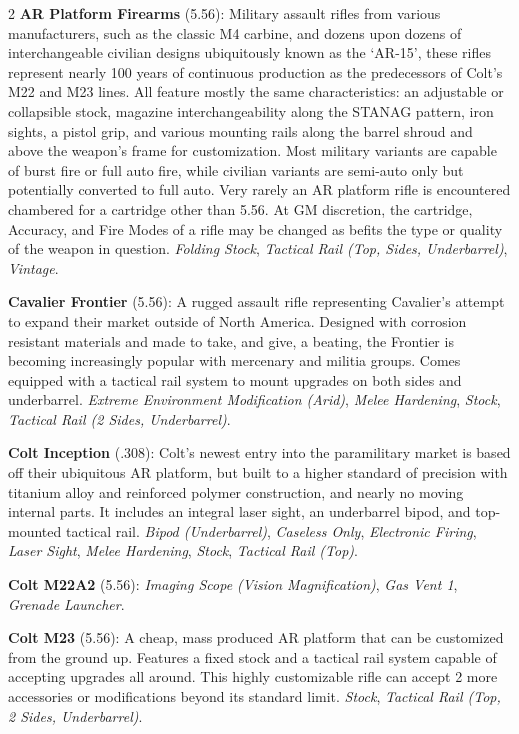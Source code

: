 \documentclass[
  oneside]{article}
\begin{document}
\begin{multicols}{2}
\textbf{AR Platform Firearms} (5.56): Military
assault rifles from various manufacturers, such as
the classic M4 carbine, and dozens upon dozens of
interchangeable civilian designs ubiquitously
known as the `AR-15', these rifles represent
nearly 100 years of continuous production as the
predecessors of Colt's M22 and M23 lines. All
feature mostly the same characteristics: an
adjustable or collapsible stock, magazine
interchangeability along the STANAG pattern, iron
sights, a pistol grip, and various mounting rails
along the barrel shroud and above the weapon's
frame for customization. Most military variants
are capable of burst fire or full auto fire, while
civilian variants are semi-auto only but
potentially converted to full auto. Very rarely an
AR platform rifle is encountered chambered for a
cartridge other than 5.56. At GM discretion, the
cartridge, Accuracy, and Fire Modes of a rifle may
be changed as befits the type or quality of the
weapon in question. \emph{Folding Stock},
\emph{Tactical Rail (Top, Sides, Underbarrel)},
\emph{Vintage}.

\textbf{Cavalier Frontier} (5.56): A rugged
assault rifle representing Cavalier's attempt to
expand their market outside of North America.
Designed with corrosion resistant materials and
made to take, and give, a beating, the Frontier is
becoming increasingly popular with mercenary and
militia groups. Comes equipped with a tactical
rail system to mount upgrades on both sides and
underbarrel. \emph{Extreme Environment
Modification (Arid)}, \emph{Melee Hardening},
\emph{Stock}, \emph{Tactical Rail (2 Sides,
Underbarrel)}.

\textbf{Colt Inception} (.308): Colt's newest
entry into the paramilitary market is based off
their ubiquitous AR platform, but built to a
higher standard of precision with titanium alloy
and reinforced polymer construction, and nearly no
moving internal parts. It includes an integral
laser sight, an underbarrel bipod, and top-mounted
tactical rail. \emph{Bipod (Underbarrel)},
\emph{Caseless Only}, \emph{Electronic Firing},
\emph{Laser Sight}, \emph{Melee Hardening},
\emph{Stock}, \emph{Tactical Rail (Top)}.

\textbf{Colt M22A2} (5.56): \emph{Imaging Scope
(Vision Magnification)}, \emph{Gas Vent 1},
\emph{Grenade Launcher}.

\textbf{Colt M23} (5.56): A cheap, mass produced
AR platform that can be customized from the ground
up. Features a fixed stock and a tactical rail
system capable of accepting upgrades all around.
This highly customizable rifle can accept 2 more
accessories or modifications beyond its standard
limit. \emph{Stock}, \emph{Tactical Rail (Top, 2
Sides, Underbarrel)}.


\end{multicols}
\end{document}

